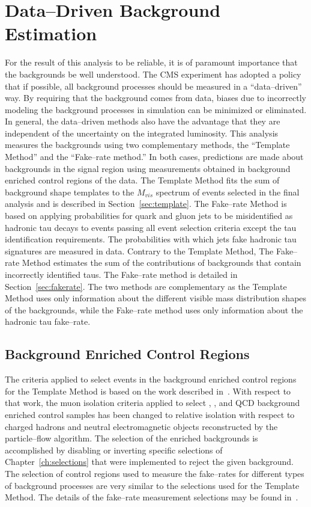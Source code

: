 \ifx\master\undefined\fi
\newcommand{\tablesize}{\small} \chapter{Data--Driven Background Estimation}
\label{ch:backgrounds}
%
For the result of this analysis to be reliable, it is of paramount importance
that the backgrounds be well understood.  The CMS experiment has adopted a
policy that if possible, all background processes should be measured in a
``data--driven'' way.  By requiring that the background comes from data, biases
due to incorrectly modeling the background processes in simulation can be
minimized or eliminated.  In general, the data--driven methods also have the
advantage that they are independent of the uncertainty on the integrated
luminosity.  This analysis measures the backgrounds using two complementary
methods, the ``Template Method'' and the ``Fake--rate method.'' In both cases,
predictions are made about backgrounds in the signal region using measurements
obtained in background enriched control regions of the data. The Template Method
fits the sum of background shape templates  to the $M_{vis}$ spectrum of events
selected in the final analysis and is described in Section~\ref{sec:template}.
The Fake--rate Method is based on applying probabilities for quark and gluon
jets to be misidentified as hadronic tau decays to events passing all event
selection criteria except the tau identification requirements.  The
probabilities with which jets fake hadronic tau signatures are measured in data.
Contrary to the Template Method, The Fake--rate Method estimates the sum of the
contributions of backgrounds that contain incorrectly identified taus.  The
Fake--rate method is detailed in Section~\ref{sec:fakerate}.  The two methods
are complementary as the Template Method uses only information about the
different visible mass distribution shapes of the backgrounds, while the
Fake--rate method uses only information about the hadronic tau fake--rate.

\section{Background Enriched Control Regions}
\label{sec:controlregions}
%
The criteria applied to select events in the background enriched control regions
for the Template Method is based on the work described in~\cite{CMS_AN_2010-088}.  With respect to that
work, the muon isolation criteria applied to select \ZMM, \WpJets, \ttbarpJets
and QCD background enriched control samples has been changed to relative
isolation with respect to charged hadrons and neutral electromagnetic objects
reconstructed by the particle--flow algorithm.   The selection of the enriched
backgrounds is accomplished by disabling or inverting specific
selections of Chapter~\ref{ch:selections} that were implemented to reject the
given background.  The selection of control regions used to measure the
fake--rates for different types of background processes are very similar to the
selections used for the Template Method.  The details of the fake--rate
measurement selections may be
found in~\cite{CMS-PAS-TAU-11-001}.

